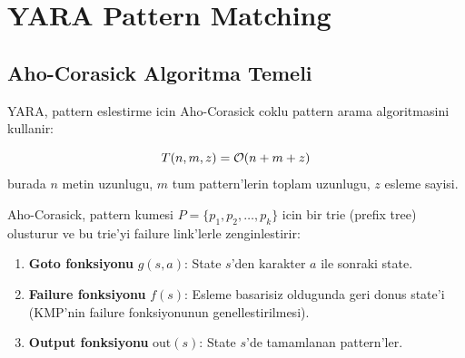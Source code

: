 \section{YARA Pattern Matching}
\label{sec:yara}

\subsection{Aho-Corasick Algoritma Temeli}

YARA, pattern eslestirme icin Aho-Corasick coklu pattern arama
algoritmasini kullanir:

\begin{equation}
  T(n, m, z) = \mathcal{O}\!\left(n + m + z\right)
  \label{eq:aho-corasick}
\end{equation}
burada $n$ metin uzunlugu, $m$ tum pattern'lerin toplam uzunlugu,
$z$ esleme sayisi.

\begin{tanim}
Aho-Corasick, pattern kumesi $P = \{p_1, p_2, \ldots, p_k\}$ icin
bir trie (prefix tree) olusturur ve bu trie'yi failure link'lerle
zenginlestirir:
\begin{enumerate}
  \item \textbf{Goto fonksiyonu} $g(s, a)$: State $s$'den karakter $a$
        ile sonraki state.
  \item \textbf{Failure fonksiyonu} $f(s)$: Esleme basarisiz oldugunda
        geri donus state'i (KMP'nin failure fonksiyonunun genellestirilmesi).
  \item \textbf{Output fonksiyonu} $\text{out}(s)$: State $s$'de tamamlanan
        pattern'ler.
\end{enumerate}
\end{tanim}

